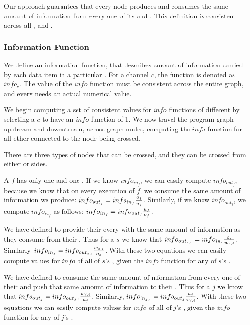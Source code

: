 Our approach guarantees that every node produces and consumes the
same amount of information from every one of its {\Input} and
{\Output} {{\Channels}}.  This definition is consistent across all
{\filters}, {\splitters} and {\joiners}.

\subsubsection{Information Function}

We define an information function, that describes amount of
information carried by each data item in a particular {{\Channel}}.
For a channel $c$, the function is denoted as $info_c$.   The
value of the $info$ function must be consistent across the entire
{\StreamIt} graph, and every {{\Channel}} needs an actual numerical
value.

We begin computing a set of consistent values for $info$ functions
of different {{\Channels}} by selecting a {{\Channel}} $c$ to have an
$info$ function of 1.  We now travel the program graph upstream
and downstream, across graph nodes, computing the $info$ function
for all other {{\Channels}} connected to the node being crossed.

There are three types of nodes that can be crossed, and they can
be crossed from either {\Input} or {\Output} sides.

\subsubsubsection{\filters}

A {\filter} $f$ has only one {\Input} and one {\Output} {{\Channel}}.  If we
know $info_{in_f}$, we can easily compute $info_{out_f}$, because
we know that on every execution of $f$, we consume the same amount
of information we produce:  $info_{out_f} = info_{in_f} {o_f \over
u_f}$.  Similarly, if we know $info_{out_f}$, we compute
$info_{in_f}$ as follows:  $info_{in_f} = info_{out_f} {u_f \over
o_f}$.

\subsubsubsection{\splitters}

We have defined {\splitters} to provide their every {\Output} {{\Channel}}
with the same amount of information as they consume from their
{\Input} {{\Channel}}.  Thus for a {\splitter} $s$ we know that
$info_{out_{s,i}} = info_{in_s} {o_s \over w_{s,i}}$.  Similarly,
$info_{in_s} = info_{out_{s,i}} {w_{s,i} \over o_s}$.  With these
two equations we can easily compute values for $info$ of all of
$s$'s {{\Channels}}, given the $info$ function for any of $s$'s
{{\Channels}}.

\subsubsubsection{\joiners}

We have defined {\joiners} to consume the same amount of information
from every one of their {\Input} {{\Channels}} and push that same amount
of information to their {\Output} {{\Channel}}. Thus for a {\joiner} $j$
we know that $info_{out_j} = info_{out_{j,i}} {w_{j,i} \over
u_j}$. Similarly, $info_{in_{j,i}} = info_{out_j} {u_j \over
w_{j,i}}$. With these two equations we can easily compute values
for $info$ of all of $j$'s {{\Channels}}, given the $info$ function
for any of $j$'s {{\Channels}}.

